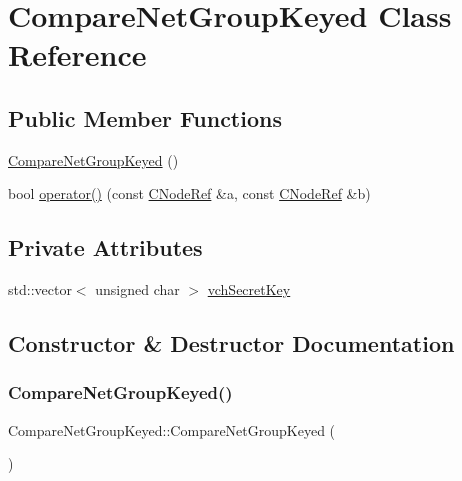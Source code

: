 \hypertarget{class_compare_net_group_keyed}{}\section{Compare\+Net\+Group\+Keyed Class Reference}
\label{class_compare_net_group_keyed}
\subsection*{Public Member Functions}
\begin{DoxyCompactItemize}
\item 
\mbox{\hyperlink{class_compare_net_group_keyed_ac3b6433ab6f27670d044ca97ca63b933}{Compare\+Net\+Group\+Keyed}} ()
\item 
bool \mbox{\hyperlink{class_compare_net_group_keyed_ae9569566c7a6db87cc38a58476cbfc40}{operator()}} (const \mbox{\hyperlink{class_c_node_ref}{C\+Node\+Ref}} \&a, const \mbox{\hyperlink{class_c_node_ref}{C\+Node\+Ref}} \&b)
\end{DoxyCompactItemize}
\subsection*{Private Attributes}
\begin{DoxyCompactItemize}
\item 
std\+::vector$<$ unsigned char $>$ \mbox{\hyperlink{class_compare_net_group_keyed_ad20bf41a9eeec19a8357dc640fd70199}{vch\+Secret\+Key}}
\end{DoxyCompactItemize}


\subsection{Constructor \& Destructor Documentation}
\mbox{\label{class_compare_net_group_keyed_ac3b6433ab6f27670d044ca97ca63b933}} 
\subsubsection{\texorpdfstring{Compare\+Net\+Group\+Keyed()}{CompareNetGroupKeyed()}}
{\footnotesize\ttfamily Compare\+Net\+Group\+Keyed\+::\+Compare\+Net\+Group\+Keyed (\begin{DoxyParamCaption}{ }\end{DoxyParamCaption})\hspace{0.3cm}{\ttfamily [inline]}}



